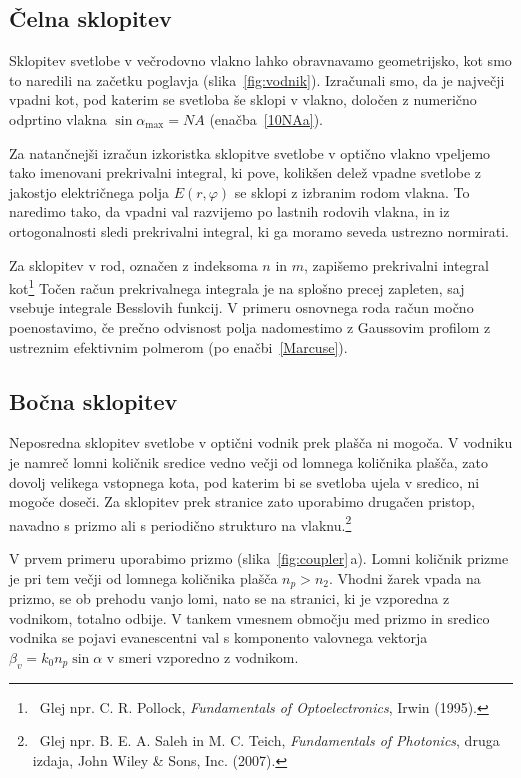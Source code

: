 \subsection*{Čelna sklopitev}
Sklopitev svetlobe v večrodovno vlakno lahko obravnavamo geometrijsko, kot smo to naredili
na začetku poglavja (slika~\ref{fig:vodnik}). Izračunali smo, da je največji 
vpadni kot, pod katerim se svetloba še sklopi v vlakno, določen z numerično odprtino 
vlakna $\sin \alpha_{\mathrm{max}}= NA$  (enačba~\ref{10NAa}).

Za natančnejši izračun izkoristka sklopitve svetlobe v optično vlakno vpeljemo 
tako imenovani prekrivalni integral, ki pove, kolikšen delež vpadne svetlobe 
z jakostjo električnega polja $E(r, \varphi)$ se sklopi z izbranim rodom 
vlakna.
To naredimo tako, da vpadni val razvijemo po lastnih rodovih vlakna, in iz ortogonalnosti
sledi prekrivalni integral, ki ga moramo seveda ustrezno normirati. 

Za sklopitev v rod, 
označen z indeksoma $n$ in $m$, zapišemo prekrivalni integral 
kot\footnote{~Glej npr. C. R. Pollock, {\it Fundamentals of Optoelectronics}, Irwin (1995).}
Točen račun prekrivalnega integrala je na splošno precej zapleten, saj vsebuje integrale
Besslovih funkcij. V primeru osnovnega roda račun močno poenostavimo, če 
prečno odvisnost polja nadomestimo z Gaussovim profilom z ustreznim 
efektivnim polmerom (po enačbi~\ref{Marcuse}). 

\subsection*{Bočna sklopitev}
Neposredna sklopitev svetlobe v optični vodnik prek plašča ni mogoča. V vodniku je namreč
lomni količnik sredice vedno večji od lomnega količnika plašča, zato dovolj velikega vstopnega 
kota, pod katerim bi se svetloba ujela v sredico, ni mogoče doseči. Za sklopitev prek stranice 
zato uporabimo drugačen pristop, navadno s prizmo ali s periodično strukturo na 
vlaknu.\footnote{~Glej npr. B. E. A. Saleh in M. C. Teich, 
{\it Fundamentals of Photonics}, druga izdaja, John Wiley \& Sons, Inc. (2007).}

V prvem primeru uporabimo prizmo (slika~\ref{fig:coupler}\,a). Lomni količnik prizme
je pri tem večji od lomnega količnika plašča $n_p > n_2$.
Vhodni žarek vpada na prizmo, se ob prehodu vanjo lomi, nato  se na stranici, ki je vzporedna
z vodnikom, totalno odbije. 
V tankem vmesnem območju med prizmo in sredico vodnika se pojavi evanescentni
val s komponento valovnega vektorja $\beta_v  = k_0 n_p \sin \alpha$ v 
smeri vzporedno z vodnikom. 

